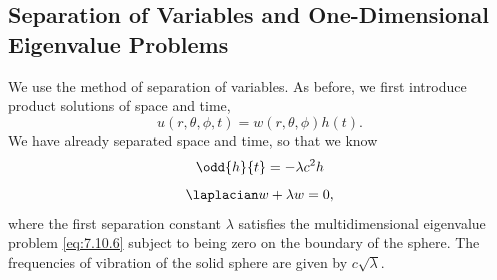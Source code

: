 \subsection{Separation of Variables and One-Dimensional Eigenvalue Problems}
\label{sec:7.10.2}

We use the method of separation of variables.  As before, we first introduce product solutions of space and time,
\begin{equation}
u(r,\theta,\phi,t) = w(r,\theta,\phi)h(t).
\label{eq:7.10.4}
\end{equation}
We have already separated space and time, so that we know
\begin{equation}
\odd{h}{t} = -\lambda c^2 h
\label{eq:7.10.5}
\end{equation}
\begin{equation}
\laplacian w + \lambda w = 0,
\label{eq:7.10.6}
\end{equation}
where the first separation constant $\lambda$ satisfies the multidimensional eigenvalue problem \eqref{eq:7.10.6} subject to being zero on the boundary of the sphere.  The frequencies of vibration of the solid sphere are given by $c\sqrt{\lambda}$.


